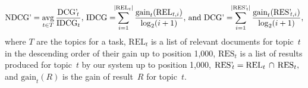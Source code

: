\begin{equation}
  \text{NDCG'} = \operatorname*{avg}_{t\in T}\frac{\text{DCG'}_{\!t}}{\text{IDCG}_t},\,
  \text{IDCG} =\!\!\!\sum_{i=1}^{|\text{REL}_t|} \frac{\text{gain}_t(\text{REL}_{t,i})}{\log_2(i+1)},\,
  \text{and DCG'} =\!\!\!\sum_{i=1}^{|\text{RES'\!}_t|} \frac{\text{gain}_t(\text{RES'\!}_{t,i})}{\log_2(i+1)},
\end{equation}
where $T$ are the topics for a task, $\text{REL}_t$ is a list of relevant documents
for topic~$t$ in the descending order of their gain up to position 1,000,
$\text{RES}_t$ is a list of results produced for topic~$t$ by our system up to position
1,000, $\text{RES'\!}_t=\text{REL}_t\,\cap\,\text{RES}_t,$ and
$\text{gain}_t(R)$ is the gain of result~$R$ for topic~$t$.
